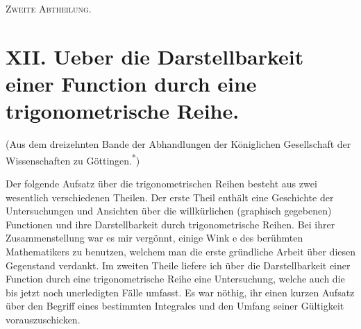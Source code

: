 \documentclass[12pt,a4paper]{book}
\theoremstyle{definition}
\theoremstyle{remark}
\begin{document}
\newpage
\thispagestyle{empty}
\vspace*{\fill}
\begin{center}
{\Huge\scshape Zweite Abtheilung.}
\end{center}
\vspace*{\fill}
\clearpage
\thispagestyle{empty}
\clearpage

\section*{XII. Ueber die Darstellbarkeit einer Function durch eine trigonometrische Reihe.}

\begin{center}
(Aus dem dreizehnten Bande der Abhandlungen der Königlichen Gesellschaft der\\
Wissenschaften zu Göttingen.\textsuperscript{*})
\end{center}

Der folgende Aufsatz über die trigonometrischen Reihen besteht aus zwei wesentlich verschiedenen Theilen. Der erste Theil enthält eine Geschichte der Untersuchungen und Ansichten über die willkürlichen (graphisch gegebenen) Functionen und ihre Darstellbarkeit durch trigonometrische Reihen. Bei ihrer Zusammenstellung war es mir vergönnt, einige Wink e des berühmten Mathematikers zu benutzen, welchem man die erste gründliche Arbeit über diesen Gegenstand verdankt. Im zweiten Theile liefere ich über die Darstellbarkeit einer Function durch eine trigonometrische Reihe eine Untersuchung, welche auch die bis jetzt noch unerledigten Fälle umfasst. Es war nöthig, ihr einen kurzen Aufsatz über den Begriff eines bestimmten Integrales und den Umfang seiner Gültigkeit vorauszuschicken.

\begingroup
\renewcommand{\thefootnote}{}
\endgroup
\end{document}
